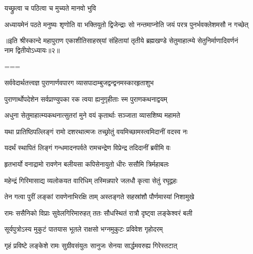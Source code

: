 \onelineshloka
{यच्छ्रुत्वा च पठित्वा च मुच्यते मानवो भुवि}%

\twolineshloka
{अध्यायमेनं पठते मनुष्यः शृणोति वा भक्तियुतो द्विजेन्द्राः}
{सो नन्तमाप्नोति जयं परत्र पुनर्भवक्लेशमसौ न गच्छेत्}%

॥इति श्रीस्कान्दे महापुराण एकाशीतिसाहस्र्यां संहितायां तृतीये ब्रह्मखण्डे सेतुमाहात्म्ये सेतुनिर्माणादिवर्णनं नाम द्वितीयोऽध्यायः॥२॥

===


\vakta{}
\shrota{}
\tags{}
\notes{}

\storymeta





\twolineshloka
{सर्ववेदार्थतत्त्वज्ञ पुराणार्णवपारग}
{व्यासपादाम्बुजद्वन्द्वनमस्कारहृताशुभ}%

\twolineshloka
{पुराणार्थोपदेशेन सर्वप्राण्युपका रक}
{त्वया ह्यनुगृहीताः स्म पुराणकथनाद्वयम्}%

\twolineshloka
{अधुना सेतुमाहात्म्यकथनात्सुतरां मुने}
{वयं कृतार्थाः सञ्जाता व्यासशिष्य महामते}%

\twolineshloka
{यथा प्रातिष्ठिपल्लिङ्गं रामो दशरथात्मजः}
{तच्छ्रोतुं वयमिच्छामस्त्वमिदानीं वदस्व नः}%


\twolineshloka
{यदर्थं स्थापितं लिङ्गं गन्धमादनपर्वते}
{रामचन्द्रेण विप्रेन्द्र तदिदानीं ब्रवीमि वः}%

\twolineshloka
{हृतभार्यो वनाद्रामो रावणेन बलीयसा}
{कपिसेनायुतो धीरः ससौमि त्रिर्महाबलः}%

\twolineshloka
{महेन्द्रं गिरिमासाद्य व्यलोकयत वारिधिम्}
{तस्मिन्नपारे जलधौ कृत्वा सेतुं रघूद्वहः}%

\twolineshloka
{तेन गत्वा पुरीं लङ्कां रावणेनाभिरक्षि ताम्}
{अस्तङ्गते सहस्रांशौ पौर्णमास्यां निशामुखे}%

\twolineshloka
{रामः ससैनिको विप्राः सुवेलगिरिमारुहत्}
{ततः सौधस्थितं रात्रौ दृष्ट्वा लङ्केश्वरं बली}%

\twolineshloka
{सूर्यपुत्रोऽस्य मुकुटं पातयास भूतले}
{राक्षसो भग्नमुकुटः प्रविवेश गृहोदरम्}%

\twolineshloka
{गृहं प्रविष्टे लङ्केशे रामः सुग्रीवसंयुतः}
{सानुजः सेनया सार्द्धमवरुह्य गिरेस्तटात्}%

